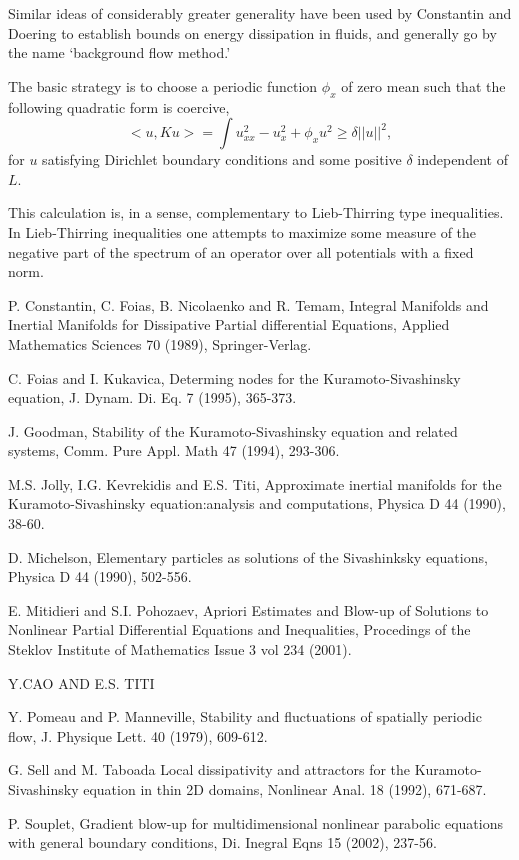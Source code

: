 Similar ideas of
considerably greater generality have been used by Constantin and Doering
to establish bounds on energy dissipation in fluids, and generally
go by the name `background flow method.'\cite{CD1,CD2}

The basic strategy is to choose a
periodic function $\phi_x$ of zero mean such that the following
quadratic form is coercive,
\[
<\!\!u, K u\!\!>= \int u_{xx}^2 - u_x^2 + \phi_x u^2 \ge \delta |\!|u|\!|^2,
\]
for $u$ satisfying Dirichlet boundary conditions and some positive
$\delta$ independent of $L$.

This calculation is, in a sense, complementary to Lieb-Thirring type
inequalities.
In Lieb-Thirring inequalities one attempts to maximize some measure of the
negative part of the spectrum of an operator over all potentials with
a fixed norm.



P. Constantin, C. Foias, B. Nicolaenko and R. Temam,
    Integral Manifolds and Inertial Manifolds for
    Dissipative Partial differential Equations,
    Applied Mathematics Sciences 70 (1989), Springer-Verlag.

C. Foias and I. Kukavica, Determing nodes for the Kuramoto-Sivashinsky equation, J. Dynam. Di. Eq. 7 (1995), 365-373.

J. Goodman, Stability of the Kuramoto-Sivashinsky equation and related systems, Comm. Pure Appl. Math 47 (1994), 293-306.

M.S. Jolly, I.G. Kevrekidis and E.S. Titi, Approximate inertial manifolds for the Kuramoto-Sivashinsky equation:analysis and computations, Physica D 44 (1990), 38-60.

D. Michelson, Elementary particles as solutions of the Sivashinksky equations, Physica D 44 (1990), 502-556.

E. Mitidieri and S.I. Pohozaev, Apriori Estimates and Blow-up of Solutions to Nonlinear Partial Differential Equations and Inequalities, Procedings of the Steklov Institute of Mathematics Issue 3 vol 234 (2001).

Y.CAO AND E.S. TITI

Y. Pomeau and P. Manneville, Stability and fluctuations of spatially periodic flow, J. Physique Lett. 40 (1979), 609-612.

G. Sell and M. Taboada Local dissipativity and attractors for the Kuramoto-Sivashinsky equation in thin 2D domains, Nonlinear Anal. 18 (1992), 671-687.

P. Souplet, Gradient blow-up for multidimensional nonlinear parabolic equations with general boundary conditions, Di. Inegral Eqns 15 (2002), 237-56.

